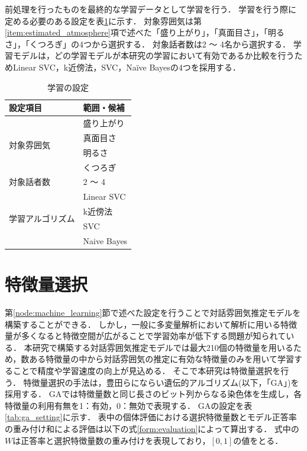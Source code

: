 前処理を行ったものを最終的な学習データとして学習を行う．
学習を行う際に定める必要のある設定を表\ref{tab:learning_setting}に示す．
対象雰囲気は第\ref{item:estimated_atmosphere}項で述べた「盛り上がり」，「真面目さ」，「明るさ」，「くつろぎ」の4つから選択する．
対象話者数は2 〜 4名から選択する．
学習モデルは，どの学習モデルが本研究の学習において有効であるか比較を行うためLinear SVC，k近傍法，SVC，Naïve Bayesの4つを採用する．

\begin{table}[t]
    \caption{学習の設定}
    \centering
    \begin{tabular}{ll}
        \hline
        設定項目 & 範囲・候補 \\ \hline\hline
        \multirow{4}{*}{対象雰囲気} & 盛り上がり \\
        & 真面目さ \\
        & 明るさ \\
        & くつろぎ \\ \hline
        対象話者数 & 2 〜 4 \\ \hline
        \multirow{4}{*}{学習アルゴリズム} & Linear SVC \\
        & k近傍法 \\
        & SVC \\
        & Naive Bayes \\ \hline
    \end{tabular}
    \label{tab:learning_setting}
\end{table}

\section{特徴量選択\label{node:ga}}

第\ref{node:machine_learning}節で述べた設定を行うことで対話雰囲気推定モデルを構築することができる．
しかし，一般に多変量解析において解析に用いる特徴量が多くなると特徴空間が広がることで学習効率が低下する問題が知られている．
本研究で構築する対話雰囲気推定モデルでは最大210個の特徴量を用いるため，数ある特徴量の中から対話雰囲気の推定に有効な特徴量のみを用いて学習することで精度や学習速度の向上が見込める．
そこで本研究は特徴量選択を行う．
特徴量選択の手法は，豊田らにならい遺伝的アルゴリズム(以下，「GA」)を採用する．
GAでは特徴量数と同じ長さのビット列からなる染色体を生成し，各特徴量の利用有無を1：有効，0：無効で表現する．
GAの設定を表\ref{tab:ga_setting}に示す．
表中の個体評価における選択特徴量数とモデル正答率の重み付け和による評価は以下の式\ref{form:evaluation}によって算出する．
式中の$W$は正答率と選択特徴量数の重み付けを表現しており，$[0, 1]$の値をとる．

